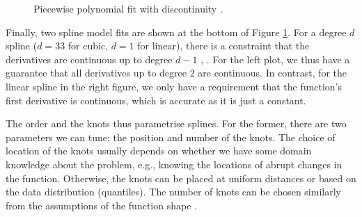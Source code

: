 \begin{figure}
    \centering
    \caption{Piecewise polynomial fit with discontinuity \cite[295]{JamesGareth2023AItS}.}
    \label{fig:discontinuity}
\end{figure}

Finally, two spline model fits are shown at the bottom of Figure \ref{fig:discontinuity}. For a degree $d$ spline ($d=33$ for cubic, $d=1$ for linear), there is a constraint that the derivatives are continuous up to degree $d-1$ \cite[296]{JamesGareth2023AItS}, \cite[187]{HastieTrevor2009EoSL}. For the left plot, we thus have a guarantee that all derivatives up to degree 2 are continuous. In contrast, for the linear spline in the right figure, we only have a requirement that the function's first derivative is continuous, which is accurate as it is just a constant.

The order and the knots thus parametrise splines. For the former, there are two parameters we can tune: the position and number of the knots. The choice of location of the knots usually depends on whether we have some domain knowledge about the problem, e.g., knowing the locations of abrupt changes in the function. Otherwise, the knots can be placed at uniform distances or based on the data distribution (quantiles). The number of knots can be chosen similarly from the assumptions of the function shape  \cite[186-189]{HastieTrevor2009EoSL}.

